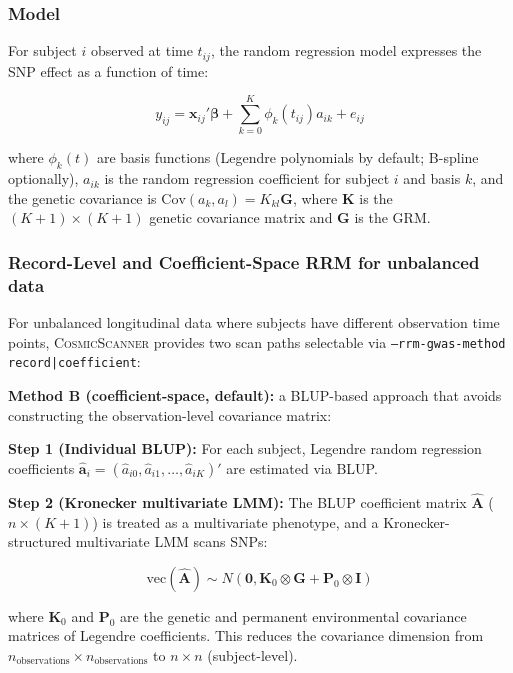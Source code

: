 \documentclass[11pt,a4paper]{article}
\newcommand{\CosmicScanner}{\textsc{CosmicScanner}}
\begin{document}
\subsubsection{Model}

For subject $i$ observed at time $t_{ij}$, the random regression model expresses the SNP effect as a function of time:

\begin{equation}
y_{ij} = \mathbf{x}_{ij}'\boldsymbol{\beta} + \sum_{k=0}^{K} \phi_k(t_{ij}) a_{ik} + e_{ij}
\label{eq:rrm}
\end{equation}

where $\phi_k(t)$ are basis functions (Legendre polynomials by default; B-spline optionally), $a_{ik}$ is the random regression coefficient for subject $i$ and basis $k$, and the genetic covariance is $\text{Cov}(a_k, a_l) = K_{kl} \mathbf{G}$, where $\mathbf{K}$ is the $(K+1) \times (K+1)$ genetic covariance matrix and $\mathbf{G}$ is the GRM.

\subsubsection{Record-Level and Coefficient-Space RRM for unbalanced data}

For unbalanced longitudinal data where subjects have different observation time points, \CosmicScanner{} provides two scan paths selectable via \texttt{--rrm-gwas-method record|coefficient}:

\textbf{Method B (coefficient-space, default):} a BLUP-based approach that avoids constructing the observation-level covariance matrix:

\textbf{Step 1 (Individual BLUP):} For each subject, Legendre random regression coefficients $\hat{\mathbf{a}}_i = (\hat{a}_{i0}, \hat{a}_{i1}, \ldots, \hat{a}_{iK})'$ are estimated via BLUP.

\textbf{Step 2 (Kronecker multivariate LMM):} The BLUP coefficient matrix $\hat{\mathbf{A}}$ ($n \times (K+1)$) is treated as a multivariate phenotype, and a Kronecker-structured multivariate LMM scans SNPs:

\begin{equation}
\text{vec}(\hat{\mathbf{A}}) \sim N(\mathbf{0}, \mathbf{K}_0 \otimes \mathbf{G} + \mathbf{P}_0 \otimes \mathbf{I})
\label{eq:kronecker}
\end{equation}

where $\mathbf{K}_0$ and $\mathbf{P}_0$ are the genetic and permanent environmental covariance matrices of Legendre coefficients. This reduces the covariance dimension from $n_{\text{observations}} \times n_{\text{observations}}$ to $n \times n$ (subject-level).
\end{document}
